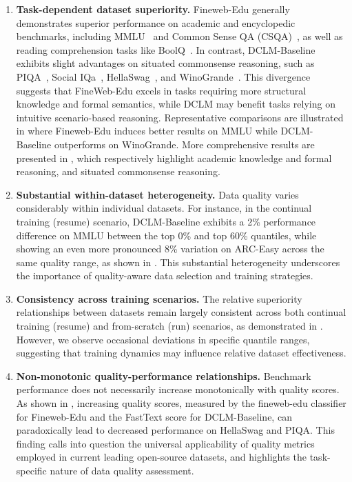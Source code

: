 \begin{enumerate}
    \item[(1)] \textbf{Task-dependent dataset superiority.} Fineweb-Edu generally demonstrates superior performance on academic and encyclopedic benchmarks, including MMLU~\cite{mmlu} and Common Sense QA (CSQA)~\cite{commonsenseqa}, as well as reading comprehension tasks like BoolQ~\cite{clark-etal-2019-boolq}. In contrast, DCLM-Baseline exhibits slight advantages on situated commonsense reasoning, such as PIQA~\cite{piqa}, Social IQa~\cite{socialiqa}, HellaSwag~\cite{hellaswag}, and WinoGrande~\cite{winogrande}. This divergence suggests that FineWeb-Edu excels in tasks requiring more structural knowledge and formal semantics, while DCLM may benefit tasks relying on intuitive scenario-based reasoning. Representative comparisons are illustrated in  where Fineweb-Edu induces better results on MMLU while DCLM-Baseline outperforms on WinoGrande. More comprehensive results are presented in , which respectively highlight academic knowledge and formal reasoning, and situated commonsense reasoning.
    \item[(2)] \textbf{Substantial within-dataset heterogeneity.} Data quality varies considerably within individual datasets. For instance, in the continual training (resume) scenario, DCLM-Baseline exhibits a 2\% performance difference on MMLU between the top 0\% and top 60\% quantiles, while showing an even more pronounced 8\% variation on ARC-Easy across the same quality range, as shown in . This substantial heterogeneity underscores the importance of quality-aware data selection and training strategies.
    
    \item[(3)] \textbf{Consistency across training scenarios.} The relative superiority relationships between datasets remain largely consistent across both continual training (resume) and from-scratch (run) scenarios, as demonstrated in . However, we observe occasional deviations in specific quantile ranges, suggesting that training dynamics may influence relative dataset effectiveness.
    
    \item[(4)] \textbf{Non-monotonic quality-performance relationships.} Benchmark performance does not necessarily increase monotonically with quality scores. As shown in , increasing quality scores, measured by the fineweb-edu classifier for Fineweb-Edu and the FastText score for DCLM-Baseline, can paradoxically lead to decreased performance on HellaSwag and PIQA. This finding calls into question the universal applicability of quality metrics employed in current leading open-source datasets, and highlights the task-specific nature of data quality assessment.
\end{enumerate}

